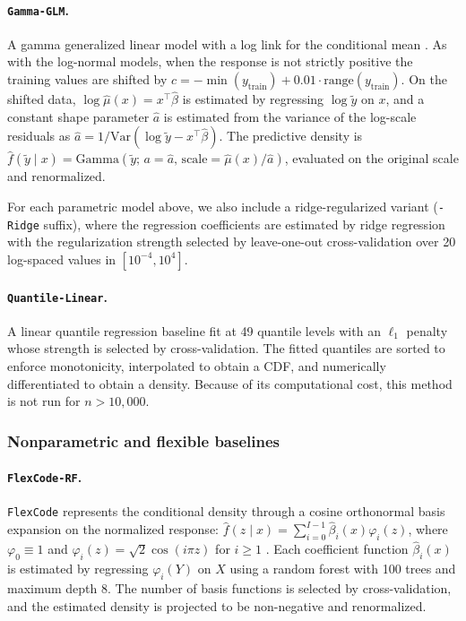 \documentclass{article}
\newcommand{\method}[1]{\texttt{#1}}
\begin{document}
\paragraph{\method{Gamma-GLM}.}
A gamma generalized linear model with a log link for the conditional mean
\citep{rigby2005generalized,kneib2023rage,klein2024distributional}. As with
the log-normal models, when the response is not strictly positive the training
values are shifted by
$c=-\min(y_{\text{train}})+0.01\cdot\mathrm{range}(y_{\text{train}})$. On the
shifted data, $\log \hat\mu(x)=x^\top\hat\beta$ is estimated by regressing
$\log\tilde y$ on $x$, and a constant shape parameter $\hat a$ is estimated
from the variance of the log-scale residuals as
$\hat a=1/\mathrm{Var}(\log\tilde y-x^\top\hat\beta)$. The predictive density
is
$\hat f(\tilde y\mid x)=\mathrm{Gamma}(\tilde y;\,a=\hat a,\,
\mathrm{scale}=\hat\mu(x)/\hat a)$, evaluated on the original scale and
renormalized.

For each parametric model above, we also include a ridge-regularized variant
(\method{-Ridge} suffix), where the regression coefficients are estimated by
ridge regression with the regularization strength selected by leave-one-out
cross-validation over 20 log-spaced values in $[10^{-4},10^4]$.

\paragraph{\method{Quantile-Linear}.}
A linear quantile regression baseline \citep{koenker1978regression} fit at 49
quantile levels with an $\ell_1$ penalty whose strength is selected by
cross-validation. The fitted quantiles are sorted to enforce monotonicity,
interpolated to obtain a CDF, and numerically differentiated to obtain a
density. Because of its computational cost, this method is not run for
$n>10{,}000$.

\subsubsection{Nonparametric and flexible baselines}
\label{app:nonparametric_details}

\paragraph{\method{FlexCode-RF}.}
\method{FlexCode} represents the conditional density through a cosine
orthonormal basis expansion on the normalized response:
$\hat f(z\mid x)=\sum_{i=0}^{I-1}\hat\beta_i(x)\varphi_i(z)$, where
$\varphi_0\equiv 1$ and
$\varphi_i(z)=\sqrt{2}\cos(i\pi z)$ for $i\geq 1$
\citep{izbicki2017converting}. Each coefficient function $\hat\beta_i(x)$ is
estimated by regressing $\varphi_i(Y)$ on $X$ using a random forest with 100
trees and maximum depth 8. The number of basis functions is selected by
cross-validation, and the estimated density is projected to be non-negative and
renormalized.
\end{document}
